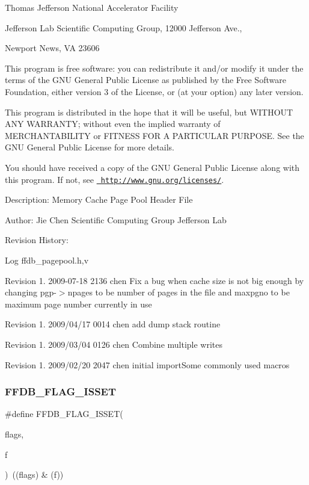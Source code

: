 Thomas Jefferson National Accelerator Facility

Jefferson Lab Scientific Computing Group, 12000 Jefferson Ave.,

Newport News, VA 23606

This program is free software\+: you can redistribute it and/or modify it under the terms of the G\+NU General Public License as published by the Free Software Foundation, either version 3 of the License, or (at your option) any later version.

This program is distributed in the hope that it will be useful, but W\+I\+T\+H\+O\+UT A\+NY W\+A\+R\+R\+A\+N\+TY; without even the implied warranty of M\+E\+R\+C\+H\+A\+N\+T\+A\+B\+I\+L\+I\+TY or F\+I\+T\+N\+E\+SS F\+OR A P\+A\+R\+T\+I\+C\+U\+L\+AR P\+U\+R\+P\+O\+SE. See the G\+NU General Public License for more details.

You should have received a copy of the G\+NU General Public License along with this program. If not, see \href{http://www.gnu.org/licenses/}{\texttt{ http\+://www.\+gnu.\+org/licenses/}}. 

 Description\+: Memory Cache Page Pool Header File

Author\+: Jie Chen Scientific Computing Group Jefferson Lab

Revision History\+: \begin{DoxyParagraph}{Log}
ffdb\+\_\+pagepool.\+h,v 
\end{DoxyParagraph}
Revision 1. 2009-\/07-\/18 2136 chen Fix a bug when cache size is not big enough by changing pgp-\/$>$npages to be number of pages in the file and maxpgno to be maximum page number currently in use

Revision 1. 2009/04/17 0014 chen add dump stack routine

Revision 1. 2009/03/04 0126 chen Combine multiple writes

Revision 1. 2009/02/20 2047 chen initial import\+Some commonly used macros \mbox{\label{adat-devel_2other__libs_2filedb_2filehash_2ffdb__pagepool_8h_a683f8c92b18290ac9441da989a5545f1}} 
\subsubsection{\texorpdfstring{FFDB\_FLAG\_ISSET}{FFDB\_FLAG\_ISSET}}
{\footnotesize\ttfamily \#define F\+F\+D\+B\+\_\+\+F\+L\+A\+G\+\_\+\+I\+S\+S\+ET(\begin{DoxyParamCaption}\item[{}]{flags,  }\item[{}]{f }\end{DoxyParamCaption})~((flags) \& (f))}


